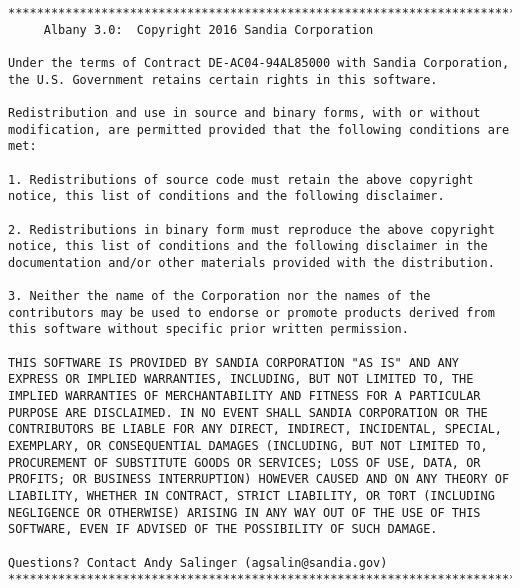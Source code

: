 \documentclass[pdf,12pt,report,strict]{SANDreport}
\theoremstyle{remark}
\begin{document}
\begin{verbatim}
************************************************************************
     Albany 3.0:  Copyright 2016 Sandia Corporation

Under the terms of Contract DE-AC04-94AL85000 with Sandia Corporation,
the U.S. Government retains certain rights in this software.

Redistribution and use in source and binary forms, with or without
modification, are permitted provided that the following conditions are
met:

1. Redistributions of source code must retain the above copyright
notice, this list of conditions and the following disclaimer.

2. Redistributions in binary form must reproduce the above copyright
notice, this list of conditions and the following disclaimer in the
documentation and/or other materials provided with the distribution.

3. Neither the name of the Corporation nor the names of the
contributors may be used to endorse or promote products derived from
this software without specific prior written permission.

THIS SOFTWARE IS PROVIDED BY SANDIA CORPORATION "AS IS" AND ANY
EXPRESS OR IMPLIED WARRANTIES, INCLUDING, BUT NOT LIMITED TO, THE
IMPLIED WARRANTIES OF MERCHANTABILITY AND FITNESS FOR A PARTICULAR
PURPOSE ARE DISCLAIMED. IN NO EVENT SHALL SANDIA CORPORATION OR THE
CONTRIBUTORS BE LIABLE FOR ANY DIRECT, INDIRECT, INCIDENTAL, SPECIAL,
EXEMPLARY, OR CONSEQUENTIAL DAMAGES (INCLUDING, BUT NOT LIMITED TO,
PROCUREMENT OF SUBSTITUTE GOODS OR SERVICES; LOSS OF USE, DATA, OR
PROFITS; OR BUSINESS INTERRUPTION) HOWEVER CAUSED AND ON ANY THEORY OF
LIABILITY, WHETHER IN CONTRACT, STRICT LIABILITY, OR TORT (INCLUDING
NEGLIGENCE OR OTHERWISE) ARISING IN ANY WAY OUT OF THE USE OF THIS
SOFTWARE, EVEN IF ADVISED OF THE POSSIBILITY OF SUCH DAMAGE.

Questions? Contact Andy Salinger (agsalin@sandia.gov)
************************************************************************
\end{verbatim}

%
\clearpage
\providecommand*{\phantomsection}{}
\phantomsection
{}


\end{document}
